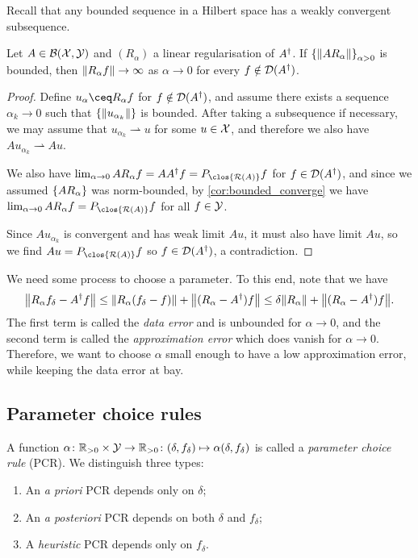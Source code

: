 \begin{recap}
	Recall that any bounded sequence in a Hilbert space has a weakly convergent subsequence. 
\end{recap}
\begin{theorem}
	Let $A \in \mathcal B(\mathcal X, \mathcal Y)$ and $(R_\alpha)$ a linear regularisation of $A^\dagger$. If $\qty{\norm{A R_\alpha}}_{\alpha > 0}$ is bounded, then $\norm{R_\alpha f} \to \infty$ as $\alpha \to 0$ for every $f \notin \operatorname{\mathcal D}(A^\dagger)$. 
\end{theorem}

\begin{proof}
	Define $u_\alpha \ceq R_\alpha f$ for $f \notin \operatorname{\mathcal D}(A^\dagger)$, and assume there exists a sequence $\alpha_k \to 0$ such that $\qty{\norm{u_{\alpha_k}}}$ is bounded. After taking a subsequence if necessary, we may assume that $u_{\alpha_k} \rightharpoonup u$ for some $u \in \mathcal X$, and therefore we also have $Au_{\alpha_k} \rightharpoonup Au$. 
	
	We also have $\lim_{\alpha \to 0} A R_\alpha f = AA\D f = P_{\clos{\Ran(A)}}f$ for $f \in \operatorname{\mathcal D}(A^\dagger)$, and since we assumed $\qty{A R_\alpha}$ was norm-bounded, by \cref{cor:bounded_converge} we have $\lim_{\alpha \to 0} AR_\alpha f = P_{\clos{\Ran(A)}} f$ for all $f \in \mathcal Y$. 
	
	Since $Au_{\alpha_k}$ is convergent and has weak limit $Au$, it must also have limit $Au$, so we find $Au = P_{\clos{\Ran(A)}} f$ so $f \in \operatorname{\mathcal D}(A^\dagger)$, a contradiction. 
\end{proof}

We need some process to choose a parameter. To this end, note that we have
\begin{equation} \label{eq:error_terms}
\norm{R_\alpha f_\delta - A^\dagger f} \leq \norm{R_\alpha (f_\delta - f)} + \norm{(R_\alpha - A^\dagger) f} \\
\leq  \delta \norm{R_\alpha} +\norm{(R_\alpha - A^\dagger) f}  . 
\end{equation}
The first term is called the \emph{data error} and is unbounded for $\alpha \to 0$, and the second term is called the \emph{approximation error} which does vanish for $\alpha \to 0$. Therefore, we want to choose $\alpha$ small enough to have a low approximation error, while keeping the data error at bay. 


\subsection{Parameter choice rules}
\begin{definition}
	A function $\alpha \colon  \mathbb R_{> 0} \times \mathcal Y \to \mathbb R_{> 0} \colon (\delta, f_\delta) \mapsto \alpha(\delta, f_\delta)$ is called a \emph{parameter choice rule} (PCR). We distinguish three types:
	\begin{enumerate}
		\item An \emph{a priori} PCR depends only on $\delta$;
		\item An \emph{a posteriori} PCR depends on both $\delta$ and $f_\delta$;
		\item A \emph{heuristic} PCR depends only on $f_\delta$. 
	\end{enumerate}
\end{definition}

